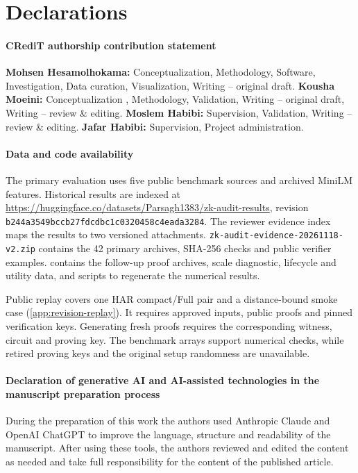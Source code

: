 \documentclass[5p,times,twocolumn]{elsarticle}
\begin{document}
\FloatBarrier
\section*{Declarations}
\paragraph{CRediT authorship contribution statement}
\textbf{Mohsen Hesamolhokama:} Conceptualization, Methodology, Software,
Investigation, Data curation, Visualization,
Writing -- original draft.
\textbf{Kousha Moeini:} Conceptualization , Methodology, Validation, Writing -- original draft,
Writing -- review \& editing.
\textbf{Moslem Habibi:} Supervision, Validation,
Writing -- review \& editing.
\textbf{Jafar Habibi:} Supervision, Project administration.
\paragraph{Data and code availability}
The primary evaluation uses five public benchmark sources and archived
MiniLM features. Historical results are indexed at
\url{https://huggingface.co/datasets/Parsagh1383/zk-audit-results},
revision \texttt{b244a3549bccb27fdcdbc1c0320458c4eada3284}.
The reviewer evidence index maps the results to two versioned
attachments. \texttt{zk-audit-evidence-20261118-v2.zip} contains the
42 primary archives, SHA-256 checks and public verifier examples.
{\def\UrlBreaks{\do\-}} contains the
follow-up proof archives, scale diagnostic, lifecycle and utility data,
and scripts to regenerate the numerical results.

Public replay covers one HAR compact/Full pair and a distance-bound
smoke case (\ref{app:revision-replay}). It requires approved inputs,
public proofs and pinned verification keys. Generating fresh proofs
requires the corresponding witness, circuit and proving key. The
benchmark arrays support numerical checks, while retired proving keys
and the original setup randomness are unavailable.

\paragraph{Declaration of generative AI and AI-assisted technologies in the manuscript preparation process}
During the preparation of this work the authors used Anthropic Claude and
OpenAI ChatGPT to improve the language, structure and readability of the
manuscript. After using these tools, the authors reviewed and edited the
content as needed and take full responsibility for the content of the
published article.
\end{document}
